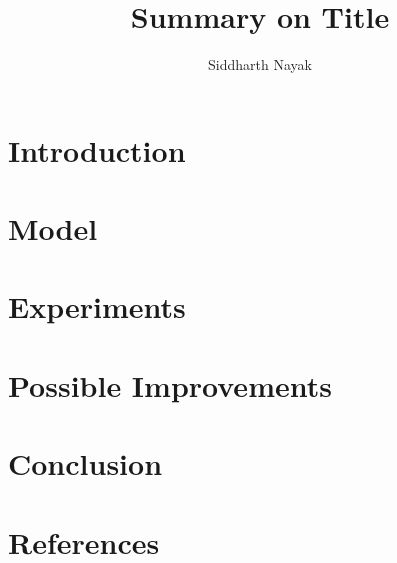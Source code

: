 \documentclass{article}
\title{Summary on Title}
\author{Siddharth Nayak }
\date{}
\begin{document}
\maketitle
\newcommand{\norm}[1]{\left\lVert#1\right\rVert}


\section{Introduction}


\section{Model}

\section{Experiments}

\section{Possible Improvements}

\section{Conclusion}

\section{References}
\\





\end{document}
